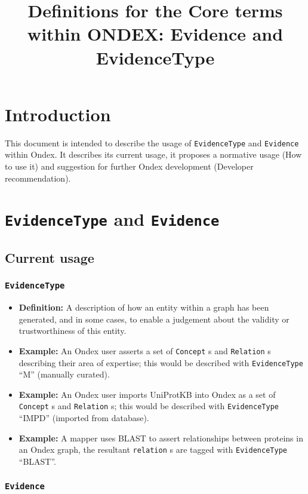 \documentclass[a4paper,10pt]{article}
\title{Definitions for the Core terms within ONDEX: Evidence and EvidenceType}
\newcommand{\defn}[1]{\item\textbf{Definition: }#1\xspace}
\newcommand{\example}[1]{\item\textbf{Example: }#1\xspace}
\newcommand{\term}[1]{\texttt{#1}\xspace}
\begin{document}
\maketitle

\section{Introduction}

This document is intended to describe the usage of \term{EvidenceType} and \term{Evidence} within Ondex.
It describes its current usage, it proposes a normative usage (How to use it) and suggestion for further Ondex development (Developer recommendation).


\section{\term{EvidenceType} and \term{Evidence}}
\subsection{Current usage}
\subsubsection{\term{EvidenceType}}

\begin{itemize}

	\defn{A description of how an entity within a graph has been generated, and in some cases, to enable a judgement about the validity or trustworthiness of this entity.}
  
	\example{An Ondex user asserts a set of \term{Concept}s and \term{Relation}s describing their area of expertise; this would be described with \term{EvidenceType} ``M'' (manually curated).}

	\example{An Ondex user imports UniProtKB into Ondex as a set of \term{Concept}s and \term{Relation}s; this would be described with \term{EvidenceType} ``IMPD'' (imported from database).}

	\example{A mapper uses BLAST to assert relationships between proteins in an Ondex graph, the resultant \term{relation}s are tagged with \term{EvidenceType} ``BLAST''.}

\end{itemize}

\subsubsection{\term{Evidence}}
\end{document}
